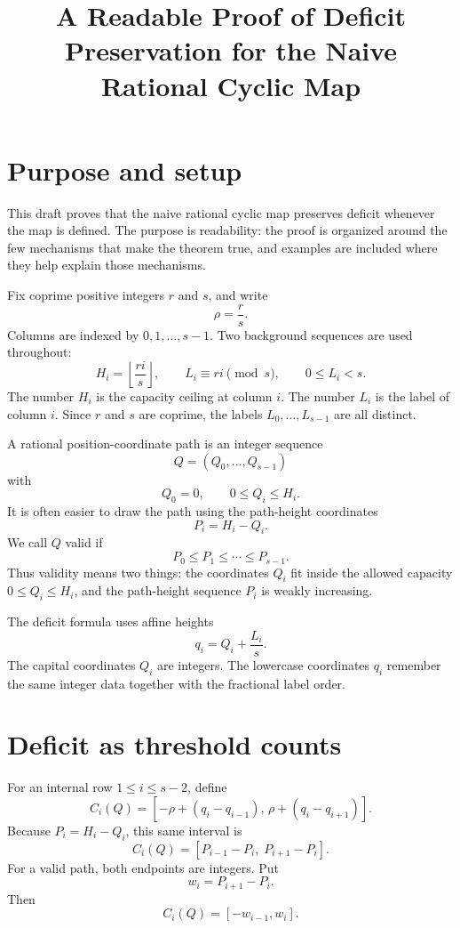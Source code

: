 \documentclass[10pt]{article}
\title{A Readable Proof of Deficit Preservation for the Naive Rational Cyclic Map}
\author{}
\date{}
\begin{document}
\maketitle

\section{Purpose and setup}

This draft proves that the naive rational cyclic map preserves deficit whenever
the map is defined.  The purpose is readability: the proof is organized around
the few mechanisms that make the theorem true, and examples are included where
they help explain those mechanisms.

Fix coprime positive integers \(r\) and \(s\), and write
\[
  \rho=\frac rs.
\]
Columns are indexed by \(0,1,\ldots,s-1\).  Two background sequences are used
throughout:
\[
  H_i=\left\lfloor\frac{ri}{s}\right\rfloor,
  \qquad
  L_i\equiv ri\pmod s,\qquad 0\le L_i<s.
\]
The number \(H_i\) is the capacity ceiling at column \(i\).  The number
\(L_i\) is the label of column \(i\).  Since \(r\) and \(s\) are coprime, the
labels \(L_0,\ldots,L_{s-1}\) are all distinct.

A rational position-coordinate path is an integer sequence
\[
  Q=(Q_0,\ldots,Q_{s-1})
\]
with
\[
  Q_0=0,\qquad 0\le Q_i\le H_i.
\]
It is often easier to draw the path using the path-height coordinates
\[
  P_i=H_i-Q_i.
\]
We call \(Q\) valid if
\[
  P_0\le P_1\le\cdots\le P_{s-1}.
\]
Thus validity means two things: the coordinates \(Q_i\) fit inside the allowed
capacity \(0\le Q_i\le H_i\), and the path-height sequence \(P_i\) is weakly
increasing.

The deficit formula uses affine heights
\[
  q_i=Q_i+\frac{L_i}{s}.
\]
The capital coordinates \(Q_i\) are integers.  The lowercase coordinates
\(q_i\) remember the same integer data together with the fractional label
order.

\section{Deficit as threshold counts}

For an internal row \(1\le i\le s-2\), define
\[
  C_i(Q)=
  \left[
    -\rho+(q_i-q_{i-1}),\,
    \rho+(q_i-q_{i+1})
  \right].
\]
Because \(P_i=H_i-Q_i\), this same interval is
\[
  C_i(Q)=[P_{i-1}-P_i,\;P_{i+1}-P_i].
\]
For a valid path, both endpoints are integers.  Put
\[
  w_i=P_{i+1}-P_i.
\]
Then
\[
  C_i(Q)=[-w_{i-1},w_i].
\]
\end{document}
